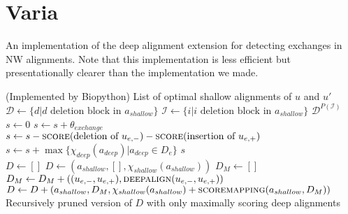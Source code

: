 \appendix
\section{Varia}

\begin{algorithm}
\caption{An implementation of the deep alignment extension for detecting exchanges in NW alignments.
Note that this implementation is less efficient but presentationally clearer than the implementation we made.
}
\label{alg:deep-alignment}
\begin{algorithmic}
  \State (Implemented by Biopython)
  \State \Return List of optimal shallow alignments of $u$ and $u'$
\EndFunction \\

  \State $\mathcal{D}\gets \{d | d\text{ deletion block in }a_{shallow}\}$
  \State $\mathcal{I}\gets \{i | i\text{ deletion block in }a_{shallow}\}$
  \State \Return $\mathcal{D}^{P(\mathcal{I})}$ 
\EndFunction \\

  \State $s\gets 0$
    \State $s\gets s + \theta_{exchange}$
    \State $s\gets s - \Call{score}{\text{deletion of }u_{e,-}} - \Call{score}{\text{insertion of }u_{e,+}}$
    \State $s\gets s + \max\{\chi_{deep}(a_{deep}) | a_{deep} \in D_e\}$
  \EndFor
  \State \Return $s$
\EndFunction \\

  \State $D\gets []$ 
      \State $D\gets (a_{shallow}, [], \chi_{shallow}(a_{shallow}))$
    \Else
        \State $D_M\gets []$
          \State $D_M\gets D_M + ((u_{e,-}, u_{e,+}), \Call{deepalign}{u_{e,-}, u_{e,+}})$
        \EndFor
        \State $D\gets D + (a_{shallow}, D_M, \chi_{shallow}(a_{shallow}) + \Call{scoremapping}{a_{shallow}, D_M})$
      \EndFor
    \EndIf
  \EndFor
  \State \Return Recursively pruned version of $D$ with only maximally scoring deep alignments
\EndFunction
\end{algorithmic}
\end{algorithm}